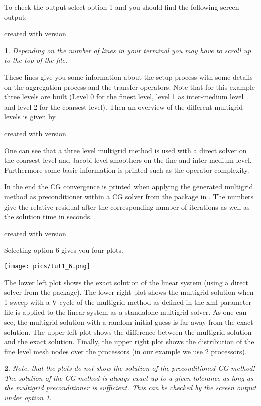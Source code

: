 \documentclass[10pt,fleqn]{book}
\newtheorem*{mycomment}{\ding{42}}
\newcommand\printScreenOutput[1]{

{\vspace{-0.3cm}\hfill\tiny{created with \muelu version }}
}
\begin{document}
To check the output select option 1 and you should find the following screen output:

\printScreenOutput{s1_easy.txt_3.fragment_1.fragment}

\begin{mycomment}
Depending on the number of lines in your terminal you may have to scroll up to the top of the file.
\end{mycomment}

These lines give you some information about the setup process with some details on the aggregation process and the transfer operators. Note that for this example three levels are built (Level 0 for the finest level, level 1 as inter-medium level and level 2 for the coarsest level). Then an overview of the different multigrid levels is given by

\printScreenOutput{s1_easy.txt_3.fragment_3.fragment}

One can see that a three level multigrid method is used with a direct solver on the coarsest level and Jacobi level smoothers on the fine and inter-medium level. Furthermore some basic information is printed such as the operator complexity.

In the end the CG convergence is printed when applying the generated multigrid method as preconditioner within a CG solver from the \aztecoo package in \trilinos.
The numbers give the relative residual after the corresponding number of iterations as well as the solution time in seconds.
\printScreenOutput{s1_easy.txt_5.fragment}

Selecting option 6 gives you four plots.
\begin{center}\texttt{[image: pics/tut1\_6.png]} \end{center}
The lower left plot shows the exact solution of the linear system (using a direct solver from the \amesos package). The lower right plot shows the multigrid solution when 1 sweep with a V-cycle of the multigrid method as defined in the xml parameter file is applied to the linear system as a standalone multigrid solver. As one can see, the multigrid solution with a random initial guess is far away from the exact solution. The upper left plot shows the difference between the multigrid solution and the exact solution. Finally, the upper right plot shows the distribution of the fine level mesh nodes over the processors (in our example we use 2 processors).

\begin{mycomment}
Note, that the plots do not show the solution of the preconditioned CG method! The solution of the CG method is always exact up to a given tolerance as long as the multigrid preconditioner is sufficient. This can be checked by the screen output under option 1.
\end{mycomment}
\end{document}
